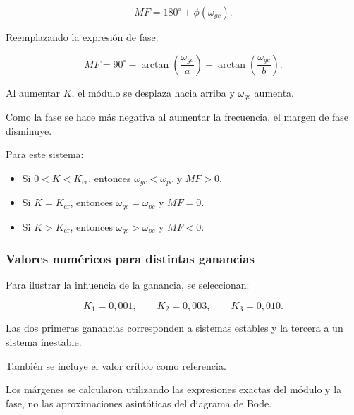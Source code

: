 \documentclass[12pt,a4paper]{article}
\begin{document}
\[
MF
=
180^\circ
+
\phi(\omega_{gc}).
\]

Reemplazando la expresión de fase:

\[
\boxed{
MF
=
90^\circ
-
\arctan
\left(
\frac{\omega_{gc}}{a}
\right)
-
\arctan
\left(
\frac{\omega_{gc}}{b}
\right).
}
\]

Al aumentar $K$, el módulo se desplaza hacia arriba
y $\omega_{gc}$ aumenta.

Como la fase se hace más negativa al aumentar la frecuencia,
el margen de fase disminuye.

Para este sistema:

\begin{itemize}

    \item Si $0<K<K_{\mathrm{cr}}$, entonces
    $\omega_{gc}<\omega_{pc}$ y $MF>0$.

    \item Si $K=K_{\mathrm{cr}}$, entonces
    $\omega_{gc}=\omega_{pc}$ y $MF=0$.

    \item Si $K>K_{\mathrm{cr}}$, entonces
    $\omega_{gc}>\omega_{pc}$ y $MF<0$.

\end{itemize}


\subsubsection*{Valores numéricos para distintas ganancias}

Para ilustrar la influencia de la ganancia, se seleccionan:

\[
K_1=0{,}001,
\qquad
K_2=0{,}003,
\qquad
K_3=0{,}010.
\]

Las dos primeras ganancias corresponden a sistemas
estables y la tercera a un sistema inestable.

También se incluye el valor crítico como referencia.

Los márgenes se calcularon utilizando las expresiones
exactas del módulo y la fase, no las aproximaciones
asintóticas del diagrama de Bode.
\end{document}
